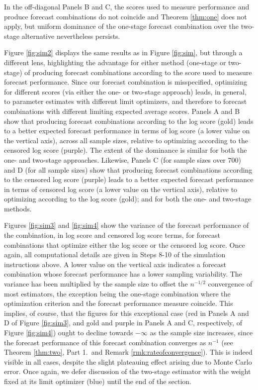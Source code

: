 \documentclass[12pt]{article}
\theoremstyle{definition}
\theoremstyle{remark}
\begin{document}
In the off-diagonal Panels B and C, the scores used to measure performance and produce forecast combinations do not coincide and Theorem \ref{thm:one} does not apply, but uniform dominance of the one-stage forecast combination over the two-stage alternative nevertheless persists.

Figure \ref{fig:sim2} displays the same results as in Figure \ref{fig:sim}, but through a different lens, highlighting the advantage for either method (one-stage or two-stage) of producing forecast combinations according to the score used to measure forecast performance. Since our forecast combination is misspecified, optimizing for different scores (via either the one- or two-stage approach) leads, in general, to parameter estimates with different limit optimizers, and therefore to forecast combinations with different limiting expected average scores. Panels A and B show that producing forecast combinations according to the log score (gold) leads to a better expected forecast performance in terms of log score (a lower value on the vertical axis), across all sample sizes, relative to optimizing according to the censored log score (purple). The extent of the dominance is similar for both the one- and two-stage approaches. Likewise, Panels C (for sample sizes over 700) and D (for all sample sizes) show that producing forecast combinations according to the censored log score (purple) leads to a better expected forecast performance in terms of censored log score (a lower value on the vertical axis), relative to optimizing according to the log score (gold); and for both the one- and two-stage methods.

Figures \ref{fig:sim3} and \ref{fig:sim4} show the variance of the forecast performance of the combination, in log score and censored log score terms, for forecast combinations that optimize either the log score or the censored log score. Once again, all computational details are given in Steps 8-10 of the simulation instructions above. A lower value on the vertical axis indicates a forecast combination whose forecast performance has a lower sampling variability. The variance has been multiplied by the sample size to offset the $n^{-1/2}$ convergence of most estimators, the exception being the one-stage combination where the optimization criterion and the forecast performance measure coincide. This implies, of course, that the figures for this exceptional case (red in Panels A and D of Figure \ref{fig:sim3}, and gold and purple in Panels A and C, respectively, of Figure \ref{fig:sim4}) ought to decline towards $-\infty$ as the sample size increases, since the forecast performance of this forecast combination converges as $n^{-1}$ (see Theorem \ref{thm:two}, Part 1.\ and Remark \ref{rmk:rateofconvergence}). This is indeed visible in all cases, despite the slight plateauing effect arising due to Monte Carlo error. Once again, we defer discussion of the two-stage estimator with the weight fixed at its limit optimizer (blue) until the end of the section.
\end{document}
